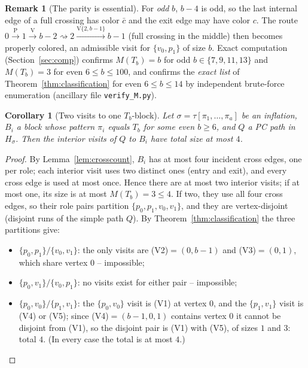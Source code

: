 \documentclass[11pt]{article}
\newtheorem{corollary}[theorem]{Corollary}
\theoremstyle{definition}
\newtheorem{remark}[theorem]{Remark}
\begin{document}
\begin{remark}[The parity is essential]\label{rem:parity}
For \emph{odd} $b$, $b - 4$ is odd, so the last internal edge of a full crossing has
color $\bar c$ and the exit edge may have color $c$. The route
$0 \xrightarrow{\mathrm P} 1 \xrightarrow{\mathrm V} b-2 \rightsquigarrow 2
\xrightarrow{\mathrm V\{2,b-1\}} b-1$ (full crossing in the middle) then becomes
properly colored, an admissible visit for $\{v_0, p_1\}$ of size $b$. Exact computation
(Section~\ref{sec:comp}) confirms $M(T_b) = b$ for odd $b \in \{7, 9, 11, 13\}$ and
$M(T_b) = 3$ for even $6 \le b \le 100$, and confirms the \emph{exact list} of
Theorem~\ref{thm:classification} for even $6 \le b \le 14$ by independent brute-force
enumeration (ancillary file \texttt{verify\_M.py}).
\end{remark}

\begin{corollary}[Two visits to one $T_b$-block]\label{cor:pairs}
Let $\sigma = \tau[\pi_1, \dots, \pi_a]$ be an inflation, $B_i$ a block whose pattern
$\pi_i$ equals $T_b$ for some even $b \ge 6$, and $Q$ a PC path in $H_\sigma$. Then the
interior visits of $Q$ to $B_i$ have total size at most $4$.
\end{corollary}

\begin{proof}
By Lemma~\ref{lem:crosscount}, $B_i$ has at most four incident cross edges, one per
role; each interior visit uses two distinct ones (entry and exit), and every cross edge
is used at most once. Hence there are at most two interior visits; if at most one, its
size is at most $M(T_b)=3\le4$. If two, they use all four cross edges, so their role
pairs partition $\{p_0, p_1, v_0, v_1\}$, and they are vertex-disjoint (disjoint runs of
the simple path $Q$). By Theorem~\ref{thm:classification} the three partitions give:
\begin{itemize}
\item $\{p_0, p_1\}/\{v_0, v_1\}$: the only visits are (V2)$=(0,b-1)$ and (V3)$=(0,1)$,
which share vertex $0$ -- impossible;
\item $\{p_0, v_1\}/\{v_0, p_1\}$: no visits exist for either pair -- impossible;
\item $\{p_0, v_0\}/\{p_1, v_1\}$: the $\{p_0,v_0\}$ visit is (V1) at vertex $0$, and
the $\{p_1,v_1\}$ visit is (V4) or (V5); since (V4)$=(b-1,0,1)$ contains vertex $0$ it
cannot be disjoint from (V1), so the disjoint pair is (V1) with (V5), of sizes $1$ and
$3$: total $4$. (In every case the total is at most $4$.)
\end{itemize}
\end{proof}
\end{document}
